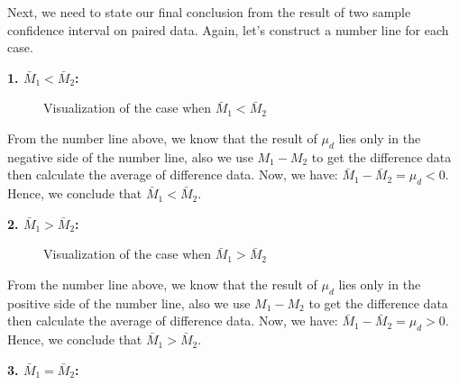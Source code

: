 Next, we need to state our final conclusion from the result of two sample confidence interval on paired data. Again, let's construct a number line for each case.

\textbf{1. $\bar{M}_1 < \bar{M}_2$:}

\begin{figure}[H]
\begin{center}
\end{center}
\caption{Visualization of the case when $\bar{M}_1 < \bar{M}_2$}
\end{figure}

From the number line above, we know that the result of $\mu_d$ lies only in the negative side of the number line, also we use $M_1 - M_2$ to get the difference data then calculate the average of difference data. Now, we have: $\bar{M}_1 - \bar{M}_2 = \mu_d < 0$. Hence, we conclude that $\bar{M}_1 < \bar{M}_2.$

\textbf{2. $\bar{M}_1 > \bar{M}_2$:}

\begin{figure}[H]
\begin{center}
\end{center}
\caption{Visualization of the case when $\bar{M}_1 > \bar{M}_2$}
\end{figure}

From the number line above, we know that the result of $\mu_d$ lies only in the positive side of the number line, also we use $M_1 - M_2$ to get the difference data then calculate the average of difference data. Now, we have: $\bar{M}_1 - \bar{M}_2 = \mu_d > 0$. Hence, we conclude that $\bar{M}_1 > \bar{M}_2.$

\textbf{3. $\bar{M}_1 = \bar{M}_2$:}

